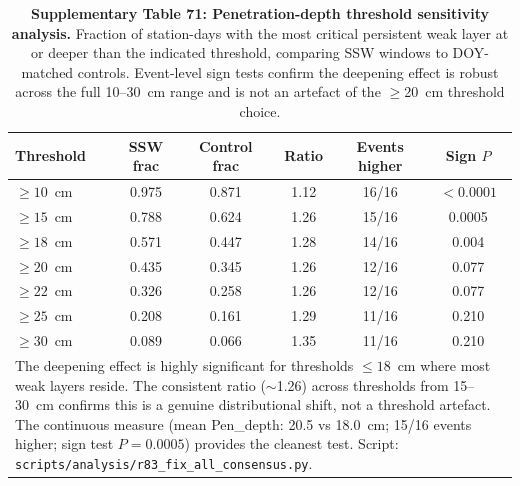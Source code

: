 \documentclass[11pt,letterpaper]{article}
\begin{document}
\begin{table}[!ht]
\centering
\caption{\textbf{Supplementary Table 71: Penetration-depth threshold sensitivity analysis.}
Fraction of station-days with the most critical persistent weak layer at or deeper than the indicated threshold, comparing SSW windows to DOY-matched controls. Event-level sign tests confirm the deepening effect is robust across the full 10--30~cm range and is not an artefact of the $\geq$20~cm threshold choice.}
\label{tab:pen_depth_sensitivity}
\small
\begin{tabular}{lccccc}
\toprule
Threshold & SSW frac & Control frac & Ratio & Events higher & Sign $P$ \\
\midrule
$\geq 10$~cm & 0.975 & 0.871 & 1.12 & 16/16 & $< 0.0001$ \\
$\geq 15$~cm & 0.788 & 0.624 & 1.26 & 15/16 & 0.0005 \\
$\geq 18$~cm & 0.571 & 0.447 & 1.28 & 14/16 & 0.004 \\
$\geq 20$~cm & 0.435 & 0.345 & 1.26 & 12/16 & 0.077 \\
$\geq 22$~cm & 0.326 & 0.258 & 1.26 & 12/16 & 0.077 \\
$\geq 25$~cm & 0.208 & 0.161 & 1.29 & 11/16 & 0.210 \\
$\geq 30$~cm & 0.089 & 0.066 & 1.35 & 11/16 & 0.210 \\
\bottomrule
\multicolumn{6}{p{14cm}}{\footnotesize The deepening effect is highly significant for thresholds $\leq 18$~cm where most weak layers reside. The consistent ratio ($\sim$1.26) across thresholds from 15--30~cm confirms this is a genuine distributional shift, not a threshold artefact. The continuous measure (mean Pen\_depth: 20.5 vs 18.0~cm; 15/16 events higher; sign test $P = 0.0005$) provides the cleanest test. Script: \texttt{scripts/analysis/r83\_fix\_all\_consensus.py}.} \\
\end{tabular}
\end{table}
\end{document}
